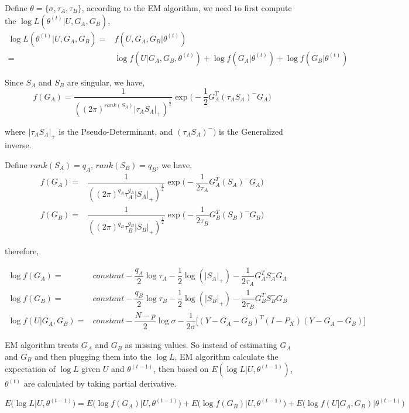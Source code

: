 \documentclass{article}
\begin{document}
    Define $\theta=\{\sigma,\tau_A,\tau_B\}$, according to the EM algorithm, we need to first compute the $\log L(\theta^{(t)}|U,G_A,G_B)$,
    \[\begin{split}
        \log L(\theta^{(t)}|U,G_A,G_B)=&f(U,G_A,G_B|\theta^{(t)})\\
                                                                 =&\log f(U|G_A,G_B,\theta^{(t)})+\log f(G_A|\theta^{(t)})+\log f(G_B|\theta^{(t)})
    \end{split}\]

    Since $S_A$ and $S_B$ are singular, we have,
    \[
        f(G_A)=\dfrac{1}{((2\pi)^{rank(S_A)}|\tau_AS_A|_+)^{\frac{1}{2}}}\exp\Big (-\dfrac{1}{2}G_A^T(\tau_AS_A)^-G_A\Big)
    \]

    where $|\tau_AS_A|_+$ is the Pseudo-Determinant, and $(\tau_AS_A)^-)$ is the Generalized inverse.

    Define $rank(S_A)=q_A$, $rank(S_B)=q_B$, we have,
    \[\begin{split}
        f(G_A)=&\dfrac{1}{((2\pi)^{q_A}\tau_A^{q_A}|S_A|_+)^{\frac{1}{2}}}\exp\Big (-\dfrac{1}{2\tau_A}G_A^T(S_A)^-G_A\Big)\\
        f(G_B)=&\dfrac{1}{((2\pi)^{q_B}\tau_B^{q_B}|S_B|_+)^{\frac{1}{2}}}\exp \Big(-\dfrac{1}{2\tau_B}G_B^T(S_B)^-G_B\Big)
    \end{split}\]

    therefore,

    \[\begin{split}
       \log f(G_A)=&constant -\dfrac{q_A}{2}\log \tau_A-\dfrac{1}{2}\log(|S_A|_+)-\dfrac{1}{2\tau_A}G_A^TS_A^-G_A\\
       \log f(G_B)=&constant -\dfrac{q_B}{2}\log \tau_B-\dfrac{1}{2}\log(|S_B|_+)-\dfrac{1}{2\tau_B}G_B^TS_B^-G_B\\
       \log f(U|G_A,G_B) =& constant-\dfrac{N-p}{2}\log\sigma-\dfrac{1}{2\sigma}\Big[(Y-G_A-G_B)^T(I-P_X)(Y-G_A-G_B)   \Big]
    \end{split}\]

    EM algorithm treats $G_A$ and $G_B$ as missing values. So instead of estimating $G_A$ and $G_B$ and then plugging them into the $\log L$, EM algorithm calculate the expectation of $\log L$ given $U$ and $\theta^{(t-1)}$, then based on $E(\log L|U,\theta^{(t-1)})$, $\theta^{(t)}$ are calculated by taking partial derivative.

    \[
        E\Big(\log L\Big|U,\theta^{(t-1)}\Big)=E\Big(\log f(G_A)\Big|U,\theta^{(t-1)}\Big)+E\Big(\log f(G_B)\Big|U,\theta^{(t-1)}\Big)+E\Big(\log f(U|G_A,G_B)\Big|\theta^{(t-1)}\Big)
    \]
\end{document}
